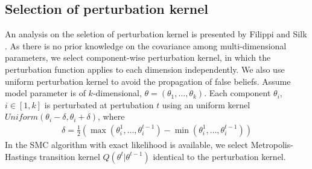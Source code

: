 \subsection{Selection of perturbation kernel}
An analysis on the seletion of perturbation kernel is presented by Filippi
\cite{filippi2013optimality} and Silk \cite{silk2012optimizing}. As there is no prior knowledge on
the covariance among multi-dimensional parameters, we select component-wise perturbation kernel, in
which the perturbation function applies to each dimension independently. We also use uniform
perturbation kernel to avoid the propagation of false beliefs. Assume model parameter is of
$k$-dimensional, $\theta=(\theta_1,\ldots,\theta_k)$. Each component $\theta_i$, $i\in [1,k]$ is
perturbated at pertubation $t$ using an uniform kernel $Uniform(\theta_i-\delta, \theta_i+\delta)$, where
\begin{align*}
    \delta = \frac{1}{2}(\max(\theta^1_i,\ldots,\theta^{t-1}_i) - \min(\theta^1_i,\ldots,\theta^{t-1}_i))
\end{align*}
In the SMC algorithm with exact likelihood is available, we select Metropolis-Hastings transition
kernel $Q(\theta^t|\theta^{t-1})$ identical to the perturbation kernel.

